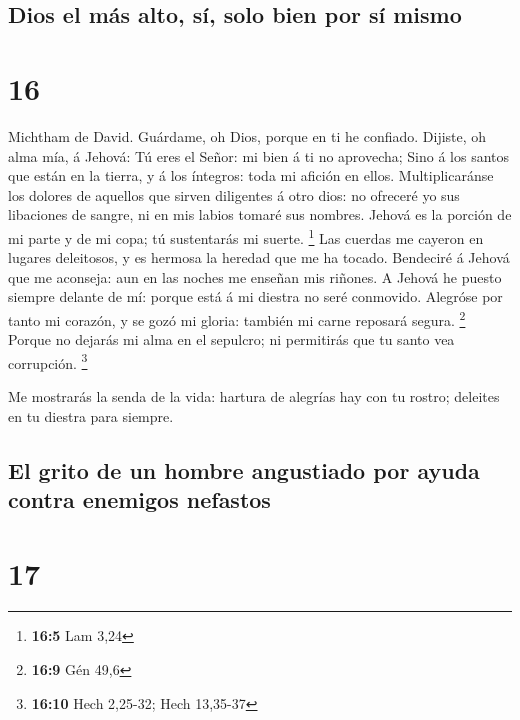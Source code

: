 \hypertarget{dios-el-muxe1s-alto-suxed-solo-bien-por-suxed-mismo}{%
\subsection{Dios el más alto, sí, solo bien por sí
mismo}\label{dios-el-muxe1s-alto-suxed-solo-bien-por-suxed-mismo}}

\hypertarget{section-15}{%
\section{16}\label{section-15}}

 Michtham de David. Guárdame, oh Dios, porque en ti he
confiado.  Dijiste, oh alma mía, á Jehová: Tú eres el Señor:
mi bien á ti no aprovecha;  Sino á los santos que están en
la tierra, y á los íntegros: toda mi afición en ellos. 
Multiplicaránse los dolores de aquellos que sirven diligentes á otro
dios: no ofreceré yo sus libaciones de sangre, ni en mis labios tomaré
sus nombres.  Jehová es la porción de mi parte y de mi copa;
tú sustentarás mi suerte. \footnote{\textbf{16:5} Lam 3,24} 
Las cuerdas me cayeron en lugares deleitosos, y es hermosa la heredad
que me ha tocado.  Bendeciré á Jehová que me aconseja: aun
en las noches me enseñan mis riñones.  A Jehová he puesto
siempre delante de mí: porque está á mi diestra no seré conmovido.
 Alegróse por tanto mi corazón, y se gozó mi gloria: también
mi carne reposará segura. \footnote{\textbf{16:9} Gén 49,6}
 Porque no dejarás mi alma en el sepulcro; ni permitirás
que tu santo vea corrupción. \footnote{\textbf{16:10} Hech 2,25-32; Hech
  13,35-37}

 Me mostrarás la senda de la vida: hartura de alegrías hay
con tu rostro; deleites en tu diestra para siempre.

\hypertarget{el-grito-de-un-hombre-angustiado-por-ayuda-contra-enemigos-nefastos}{%
\subsection{El grito de un hombre angustiado por ayuda contra enemigos
nefastos}\label{el-grito-de-un-hombre-angustiado-por-ayuda-contra-enemigos-nefastos}}

\hypertarget{section-16}{%
\section{17}\label{section-16}}

